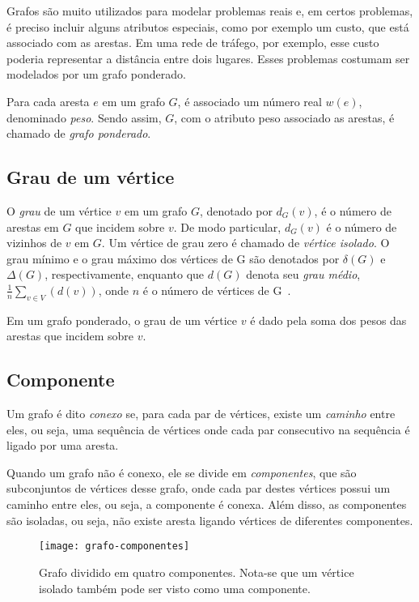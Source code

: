 Grafos são muito utilizados para modelar problemas reais e, em certos problemas, é preciso incluir alguns atributos especiais, como por exemplo um custo, que está associado com as arestas. Em uma rede de tráfego, por exemplo, esse custo poderia representar a distância entre dois lugares. Esses problemas costumam ser modelados por um grafo ponderado.

Para cada aresta $e$ em um grafo $G$, é associado um número real $w(e)$, denominado \emph{peso}. Sendo assim, $G$, com o atributo peso associado as arestas, é chamado de \emph{grafo ponderado}.

\subsection{Grau de um vértice}
\label{conceitos__grafo--grau}

\def \variable {\emph{v}}

O \emph{grau} de um vértice $v$ em um grafo $G$, denotado por $d_G(v)$, é o número de arestas em $G$ que incidem sobre $v$. De modo particular, $d_G(v)$ é o número de vizinhos de $v$ em $G$. Um vértice de grau zero é chamado de \emph{vértice isolado}. O grau mínimo e o grau máximo dos vértices de G são denotados por $\delta(G)$ e $\Delta(G)$, respectivamente, enquanto que $d(G)$ denota seu \emph{grau médio}, $\frac{1}{n}\sum_{v\in V}(d(v))$, onde $n$ é o número de vértices de G~\cite{bondy1976graph}.

Em um grafo ponderado, o grau de um vértice $v$ é dado pela soma dos pesos das arestas que incidem sobre $v$.

\subsection{Componente}
\label{conceitos__grafo--componente}

Um grafo é dito \emph{conexo} se, para cada par de vértices, existe um \emph{caminho} entre eles, ou seja, uma sequência de vértices onde cada par consecutivo na sequência é ligado por uma aresta.

Quando um grafo não é conexo, ele se divide em \emph{componentes}, que são subconjuntos de vértices desse grafo, onde cada par destes vértices possui um caminho entre eles, ou seja, a componente é conexa. Além disso, as componentes são isoladas, ou seja, não existe aresta ligando vértices de diferentes componentes.

\begin{figure}[H]
    \texttt{[image: grafo-componentes]}
    \centering
    \caption{Grafo dividido em quatro componentes. Nota-se que um vértice isolado também pode ser visto como uma componente.}
\end{figure}

